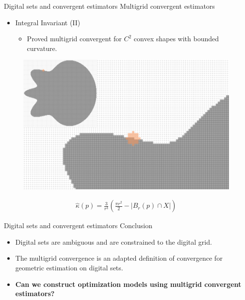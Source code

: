  \begin{frame}
	{Digital sets and convergent estimators}	
	{Multigrid convergent estimators}	
%
	\begin{itemize}
		\item{Integral Invariant (II)~}
		\begin{itemize}
			\item{Proved multigrid convergent for $C^2$ convex shapes with bounded curvature.}
		\end{itemize}		
	\end{itemize}
	
	
	\begin{figure}
	\includegraphics[scale=0.4]{figures/motivation/digital-geometric-estimators/ii/zoom/fr3-zoom.png}%
	\end{figure}		

	\vspace{1.5em}

	\begin{align*}
		\hat{\kappa}(p) = \frac{3}{r^3}\left( \frac{\pi r^2}{2} - | B_r(p) \cap X | \right )
	\end{align*}
	
      \end{frame}

\begin{frame}
	{Digital sets and convergent estimators}	
	{Conclusion}	

	\begin{itemize}
		\item{Digital sets are ambiguous and are constrained to the digital grid.}\\[1em]
		\item{The multigrid convergence is an adapted definition of convergence for geometric estimation on digital sets.}\\[2em]\pause
		\item[]{\textbf{Can we construct optimization models using multigrid convergent estimators?}}
	\end{itemize}

\end{frame}